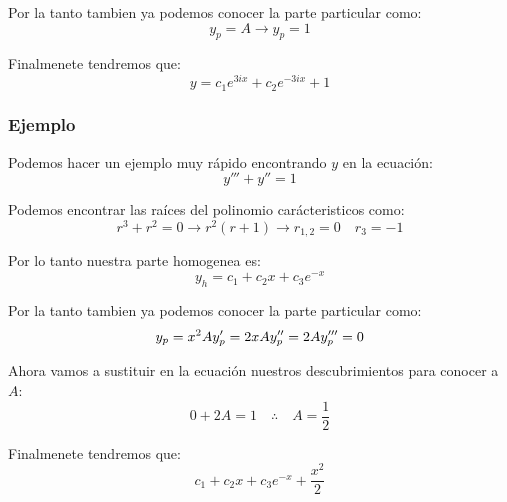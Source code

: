 \documentclass[12pt]{report}                               %
\begin{document}
            Por la tanto tambien ya podemos conocer la parte particular como:
            \begin{equation*}
                y_p = A \to y_p = 1
            \end{equation*}

            Finalmenete tendremos que:
            \begin{equation*}
                y = c_1 e^{3ix} + c_2 e^{-3ix} + 1
            \end{equation*}

        \clearpage
        \subsubsection{Ejemplo}
            Podemos hacer un ejemplo muy rápido encontrando $y$ en la ecuación:
            \begin{equation*}
                y''' + y'' = 1
            \end{equation*}

            Podemos encontrar las raíces del polinomio carácteristicos como:
            \begin{equation*}
                r^3 + r^2 = 0 \to r^2(r+1) \to r_{1,2} = 0  \quad r_{3} = -1 
            \end{equation*}

            Por lo tanto nuestra parte homogenea es:
            \begin{equation*}
                y_h = c_1 + c_2x + c_3e^{-x}
            \end{equation*}

            Por la tanto tambien ya podemos conocer la parte particular como:
            \begin{equation*}
                y_p   = x^2A \\
                y_p'  = 2xA  \\
                y_p'' = 2A   \\
                y_p'''= 0   
            \end{equation*}

            Ahora vamos a sustituir en la ecuación nuestros descubrimientos para conocer a $A$:
            \begin{equation*}
                0 + 2A = 1 \quad \therefore \quad A = \frac{1}{2}
            \end{equation*}

            Finalmenete tendremos que:
            \begin{equation*}
                c_1 + c_2x + c_3e^{-x} + \frac{x^2}{2}
            \end{equation*}
\end{document}
